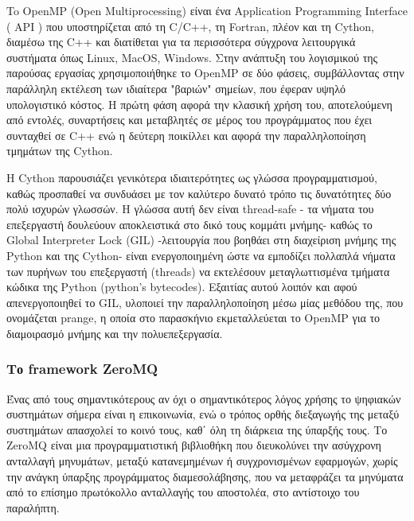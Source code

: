   

To OpenMP (Open Multiprocessing) \cite{openmp08} είναι ένα Application Programming Interface ( API ) που υποστηρίζεται από τη C/C++, τη Fortran, πλέον και τη Cython, διαμέσω της C++  και διατίθεται για τα περισσότερα σύγχρονα λειτουργικά συστήματα όπως Linux, MacOS, Windows. Στην ανάπτυξη του λογισμικού της παρούσας εργασίας χρησιμοποιήθηκε το OpenMP σε δύο φάσεις, συμβάλλοντας στην παράλληλη εκτέλεση των ιδιαίτερα "βαριών" σημείων, που έφεραν υψηλό υπολογιστικό κόστος. Η πρώτη φάση αφορά την κλασική χρήση του, αποτελούμενη από εντολές, συναρτήσεις και μεταβλητές σε μέρος του προγράμματος που έχει συνταχθεί σε C++ ενώ η δεύτερη ποικίλλει και αφορά την παραλληλοποίηση τμημάτων της Cython.  

Η Cython παρουσιάζει γενικότερα ιδιαιτερότητες ως γλώσσα προγραμματισμού, καθώς προσπαθεί να συνδυάσει με τον καλύτερο δυνατό τρόπο τις δυνατότητες δύο πολύ ισχυρών γλωσσών. Η γλώσσα αυτή δεν είναι thread-safe - τα νήματα του επεξεργαστή δουλεύουν αποκλειστικά στο δικό τους κομμάτι μνήμης- καθώς το Global Interpreter Lock (GIL) -λειτουργία που βοηθάει στη διαχείριση μνήμης της Python και της Cython- είναι ενεργοποιημένη ώστε να εμποδίζει πολλαπλά νήματα των πυρήνων του επεξεργαστή (threads) να εκτελέσουν μεταγλωττισμένα τμήματα κώδικα της Python (python's bytecodes). Εξαιτίας αυτού λοιπόν και αφού απενεργοποιηθεί το GIL, υλοποιεί την παραλληλοποίηση μέσω μίας μεθόδου της, που ονομάζεται prange, η οποία στο παρασκήνιο εκμεταλλεύεται το OpenMP για το διαμοιρασμό μνήμης και την πολυεπεξεργασία. 

\subsubsection{Το \lt framework ZeroMQ}


Ένας από τους σημαντικότερους αν όχι ο σημαντικότερος λόγος χρήσης το ψηφιακών συστημάτων σήμερα είναι η επικοινωνία, ενώ ο τρόπος ορθής διεξαγωγής της μεταξύ συστημάτων απασχολεί το κοινό τους, καθ΄ όλη τη διάρκεια της ύπαρξής τους. Το ZeroMQ \cite{zeroMQ}\cite{zeroMQHitjens} είναι μια προγραμματιστική βιβλιοθήκη που διευκολύνει την ασύγχρονη ανταλλαγή μηνυμάτων, μεταξύ κατανεμημένων ή συγχρονισμένων εφαρμογών, χωρίς την ανάγκη ύπαρξης προγράμματος διαμεσολάβησης, που να μεταφράζει τα μηνύματα από το επίσημο πρωτόκολλο ανταλλαγής του αποστολέα, στο αντίστοιχο του παραλήπτη.  


